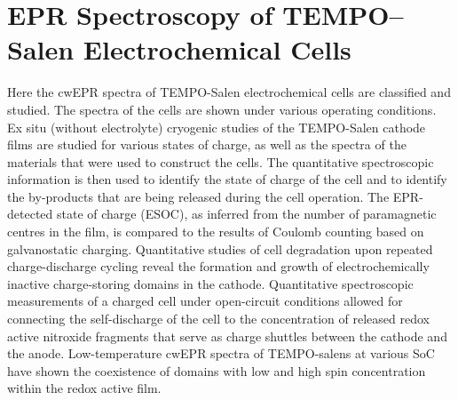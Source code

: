 \chapter{EPR Spectroscopy of TEMPO--Salen Electrochemical Cells}
\label{ch:SPINS_AT_WORK}
Here the cwEPR spectra of TEMPO-Salen electrochemical cells are classified and studied. The spectra of the cells are shown under various operating conditions. Ex situ (without electrolyte) cryogenic studies of the TEMPO-Salen cathode films are studied for various states of charge, as well as the spectra of the materials that were used to construct the cells.
The quantitative spectroscopic information is then used to identify the state of charge of the cell and to identify the by-products that are being released during the cell operation. The EPR-detected state of charge (ESOC), as inferred from the number of paramagnetic centres in the film, is compared to the results of Coulomb counting based on galvanostatic charging. Quantitative studies of cell degradation upon repeated charge-discharge cycling reveal the formation and growth of electrochemically inactive charge-storing domains in the cathode. Quantitative spectroscopic measurements of a charged cell under open-circuit conditions allowed for connecting the self-discharge of the cell to the concentration of released redox active nitroxide fragments that serve as charge shuttles between the cathode and the anode. Low-temperature cwEPR spectra of TEMPO-salens at various SoC have shown the coexistence of domains with low and high spin concentration within the redox active film.


